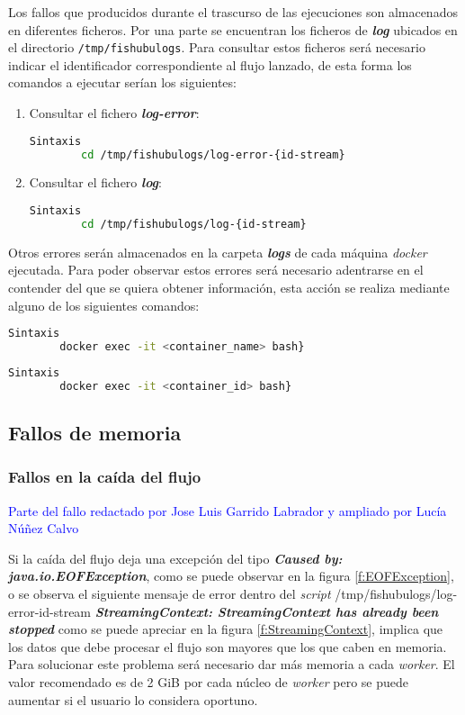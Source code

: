 Los fallos que producidos durante el trascurso de las ejecuciones son almacenados en diferentes ficheros. Por una parte se encuentran los ficheros de \textit{\textbf{log}} ubicados en el directorio \texttt{/tmp/fishubulogs}. Para consultar estos ficheros será necesario indicar el identificador correspondiente al flujo lanzado, de esta forma los comandos a ejecutar serían los siguientes:
\begin{enumerate}
    \item Consultar el fichero \textit{\textbf{log-error}}:
    \begin{lstlisting}[language=Bash]
 Sintaxis
	    cd /tmp/fishubulogs/log-error-{id-stream} 
    \end{lstlisting}
    \item Consultar el fichero \textit{\textbf{log}}:
    \begin{lstlisting}[language=Bash]
 Sintaxis
	    cd /tmp/fishubulogs/log-{id-stream} 
    \end{lstlisting}
\end{enumerate}

Otros errores serán almacenados en la carpeta \textit{\textbf{logs}} de cada máquina \textit{docker} ejecutada. Para poder observar estos errores será necesario adentrarse en el contender del que se quiera obtener información, esta acción se realiza mediante alguno de los siguientes comandos:
\begin{lstlisting}[language=Bash]
 Sintaxis
	    docker exec -it <container_name> bash}
\end{lstlisting}
\begin{lstlisting}[language=Bash]
 Sintaxis
	    docker exec -it <container_id> bash}
\end{lstlisting}

\subsection{Fallos de memoria}
\subsubsection{Fallos en la caída del flujo}
\textcolor{blue}{Parte del fallo redactado por Jose Luis Garrido Labrador y ampliado por Lucía Núñez Calvo}

Si la caída del flujo deja una excepción del tipo \textit{\textbf{Caused by: java.io.EOFException}}, como se puede observar en la figura \ref{f:EOFException}, o se observa el siguiente mensaje de error dentro del \textit{script} {/tmp/fishubulogs/log-error-{id-stream}} \textit{\textbf{StreamingContext: StreamingContext has already been stopped}} como se puede apreciar en la figura \ref{f:StreamingContext}, implica que los datos que debe procesar el flujo son mayores que los que caben en memoria.
Para solucionar este problema será necesario dar más memoria a cada \textit{worker}. El valor recomendado es de 2 GiB por cada núcleo de \textit{worker} pero se puede aumentar si el usuario lo considera oportuno.

